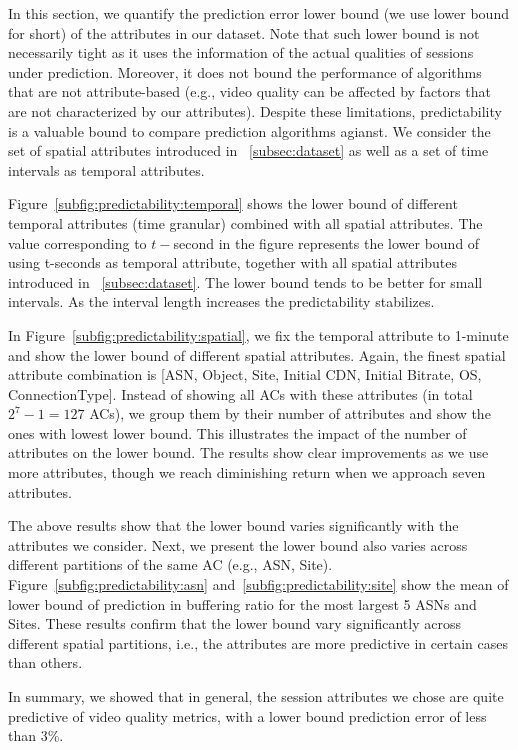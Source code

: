 

In this section, we quantify the prediction error lower bound (we use lower bound for short) of the attributes in our dataset. Note that such lower bound is not necessarily tight as it uses the information of the actual qualities of sessions under prediction. Moreover, it does not bound the performance of algorithms that are not attribute-based (e.g., video quality can be affected by factors that are not characterized by our attributes).
Despite these limitations, predictability is a valuable bound to compare prediction algorithms agianst. We consider the set of spatial attributes introduced in \Section~\ref{subsec:dataset} as well as a set of time intervals as temporal attributes.

 Figure~\ref{subfig:predictability:temporal} shows the lower bound of different temporal attributes (time granular) combined with all spatial attributes. The value corresponding to $t-$second in the figure represents the lower bound of using t-seconds as temporal attribute, together with all spatial attributes introduced in \Section~\ref{subsec:dataset}. The lower bound tends to be better for small intervals. As the interval length increases the predictability stabilizes. 

 In Figure~\ref{subfig:predictability:spatial}, we fix the temporal attribute to 1-minute and show the lower bound of different spatial attributes. Again, the finest spatial attribute combination is [ASN, Object, Site, Initial CDN, Initial Bitrate, OS, ConnectionType].  Instead of showing all ACs with these attributes (in total $2^7-1=127$ ACs), we group them by their number of attributes and show the ones with lowest lower bound. This illustrates the impact of the number of attributes on the lower bound. The results show clear improvements as we use more attributes, though we reach diminishing return when we approach seven attributes.

 The above results show that the lower bound varies significantly with the attributes we consider. Next, we present the lower bound also varies across different partitions of the same AC (e.g., ASN, Site). Figure~\ref{subfig:predictability:asn} and~\ref{subfig:predictability:site} show the mean of lower bound of prediction in buffering ratio for the most largest 5 ASNs and Sites. These results confirm that the lower bound vary significantly across different spatial partitions, i.e., the attributes are more predictive in certain cases than others. %

In summary, we showed that in general, the session attributes we chose are quite predictive of video quality metrics, with a lower bound prediction error of less than 3\%.


